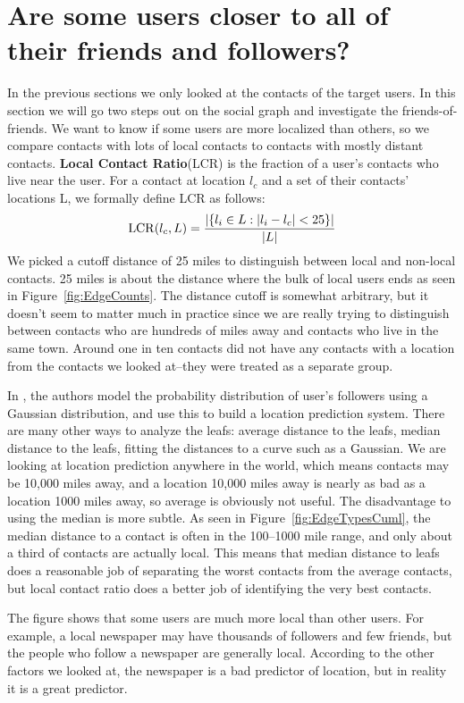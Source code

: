 \section{Are some users closer to all of their friends and followers?}
\label{sec:closer}

In the previous sections we only looked at the contacts of the target
users.
%
In this section we will go two steps out on the social graph and
investigate the friends-of-friends.
%
We want to know if some users are more localized than others, so we compare
contacts with lots of local contacts to contacts with mostly distant contacts.
%
\textbf{Local Contact Ratio}(LCR) is the fraction of a user's contacts
who live near the user.
%
For a contact at location $l_c$ and a set of their contacts' locations L, we
formally define LCR as follows:
\[
    \operatorname{LCR}(l_c,L) = { |\{ l_i \in L : |l_i-l_c|<25 \}|
                    \over |L| }
\]
%
We picked a cutoff distance of 25 miles to distinguish between local and non-local
contacts.
25 miles is about the distance where the bulk of local users ends as seen in
Figure~\ref{fig:EdgeCounts}.
%
The distance cutoff is somewhat arbitrary, but it doesn't seem to matter much
in practice since we are really trying to distinguish between contacts who are
hundreds of miles away and contacts who live in the same town.
%
Around one in ten contacts did not have any contacts with a location from the
contacts we looked at--they were treated as a separate group.

In \cite{li2012towards}, the authors model the probability distribution of
user's followers using a Gaussian distribution, and use this to build a
location prediction system.
%
There are many other ways to analyze the leafs: average distance to the leafs,
median distance to the leafs, fitting the distances to a curve such as a
Gaussian.
%
We are looking at location prediction anywhere in the world, which means
contacts may be 10,000 miles away, and a location 10,000 miles away is nearly
as bad as a location 1000 miles away, so average is obviously not useful.
%
The disadvantage to using the median is more subtle.
%
As seen in Figure~\ref{fig:EdgeTypesCuml}, the median distance to a contact is
often in the 100--1000 mile range, and only about a third of contacts are
actually local.
%
This means that median distance to leafs does a reasonable job of separating the
worst contacts from the average contacts, but local contact ratio does a better
job of identifying the very best contacts.

The figure shows that some users are much more local than other users.
For example, a local newspaper may have thousands of followers and few friends,
but the people who follow a newspaper are generally local.
According to the other factors we looked at, the newspaper is a bad predictor
of location, but in reality it is a great predictor.


